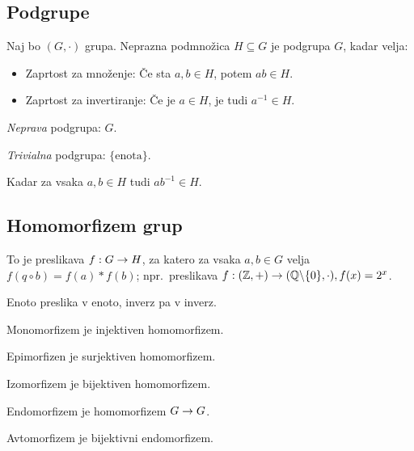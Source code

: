 \subsection{Podgrupe}


Naj bo $(G, \cdot)$ grupa. Neprazna podmnožica $H \subseteq G$ je podgrupa $G$, kadar velja:

\begin{itemize}
	\item Zaprtost za množenje: Če sta $a, b \in H$, potem $ab \in H$.
	\item Zaprtost za invertiranje: Če je $a \in H$, je tudi $a^{-1} \in H$.
\end{itemize}


\textit{Neprava} podgrupa: $G$.

\textit{Trivialna} podgrupa: $\{\text{enota}\}$.


Kadar za vsaka $a, b \in H$ tudi $ab^{-1} \in H$.

\subsection{Homomorfizem grup}


To je preslikava $f: G \to H$, za katero za vsaka $a, b \in G$ velja $f(q\circ b) = f(a) * f(b)$; npr.~preslikava $f: (\mathbb{Z}, +) \to (\mathbb{Q} \backslash \{0\}, \cdot), f(x) = 2^x$.


Enoto preslika v enoto, inverz pa v inverz.


Monomorfizem je injektiven homomorfizem.

Epimorfizen je surjektiven homomorfizem.

Izomorfizem je bijektiven homomorfizem.

Endomorfizem je homomorfizem $G \to G$.

Avtomorfizem je bijektivni endomorfizem.

